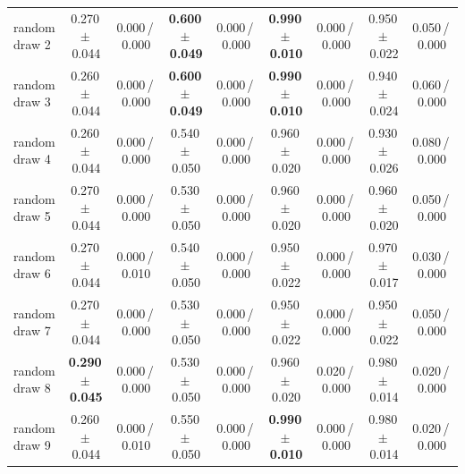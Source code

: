 \begin{tabular}{@{}lcccccccc@{}}
random draw 2 & 0.270\,{\scriptsize$\pm$\,0.044} & {\scriptsize 0.000\,/\,0.000} & \textbf{0.600\,{\scriptsize$\pm$\,0.049}} & {\scriptsize 0.000\,/\,0.000} & \textbf{0.990\,{\scriptsize$\pm$\,0.010}} & {\scriptsize 0.000\,/\,0.000} & 0.950\,{\scriptsize$\pm$\,0.022} & {\scriptsize 0.050\,/\,0.000} \\
random draw 3 & 0.260\,{\scriptsize$\pm$\,0.044} & {\scriptsize 0.000\,/\,0.000} & \textbf{0.600\,{\scriptsize$\pm$\,0.049}} & {\scriptsize 0.000\,/\,0.000} & \textbf{0.990\,{\scriptsize$\pm$\,0.010}} & {\scriptsize 0.000\,/\,0.000} & 0.940\,{\scriptsize$\pm$\,0.024} & {\scriptsize 0.060\,/\,0.000} \\
random draw 4 & 0.260\,{\scriptsize$\pm$\,0.044} & {\scriptsize 0.000\,/\,0.000} & 0.540\,{\scriptsize$\pm$\,0.050} & {\scriptsize 0.000\,/\,0.000} & 0.960\,{\scriptsize$\pm$\,0.020} & {\scriptsize 0.000\,/\,0.000} & 0.930\,{\scriptsize$\pm$\,0.026} & {\scriptsize 0.080\,/\,0.000} \\
\midrule
random draw 5 & 0.270\,{\scriptsize$\pm$\,0.044} & {\scriptsize 0.000\,/\,0.000} & 0.530\,{\scriptsize$\pm$\,0.050} & {\scriptsize 0.000\,/\,0.000} & 0.960\,{\scriptsize$\pm$\,0.020} & {\scriptsize 0.000\,/\,0.000} & 0.960\,{\scriptsize$\pm$\,0.020} & {\scriptsize 0.050\,/\,0.000} \\
random draw 6 & 0.270\,{\scriptsize$\pm$\,0.044} & {\scriptsize 0.000\,/\,0.010} & 0.540\,{\scriptsize$\pm$\,0.050} & {\scriptsize 0.000\,/\,0.000} & 0.950\,{\scriptsize$\pm$\,0.022} & {\scriptsize 0.000\,/\,0.000} & 0.970\,{\scriptsize$\pm$\,0.017} & {\scriptsize 0.030\,/\,0.000} \\
random draw 7 & 0.270\,{\scriptsize$\pm$\,0.044} & {\scriptsize 0.000\,/\,0.000} & 0.530\,{\scriptsize$\pm$\,0.050} & {\scriptsize 0.000\,/\,0.000} & 0.950\,{\scriptsize$\pm$\,0.022} & {\scriptsize 0.000\,/\,0.000} & 0.950\,{\scriptsize$\pm$\,0.022} & {\scriptsize 0.050\,/\,0.000} \\
random draw 8 & \textbf{0.290\,{\scriptsize$\pm$\,0.045}} & {\scriptsize 0.000\,/\,0.000} & 0.530\,{\scriptsize$\pm$\,0.050} & {\scriptsize 0.000\,/\,0.000} & 0.960\,{\scriptsize$\pm$\,0.020} & {\scriptsize 0.020\,/\,0.000} & 0.980\,{\scriptsize$\pm$\,0.014} & {\scriptsize 0.020\,/\,0.000} \\
random draw 9 & 0.260\,{\scriptsize$\pm$\,0.044} & {\scriptsize 0.000\,/\,0.010} & 0.550\,{\scriptsize$\pm$\,0.050} & {\scriptsize 0.000\,/\,0.000} & \textbf{0.990\,{\scriptsize$\pm$\,0.010}} & {\scriptsize 0.000\,/\,0.000} & 0.980\,{\scriptsize$\pm$\,0.014} & {\scriptsize 0.020\,/\,0.000} \\

\end{tabular}
